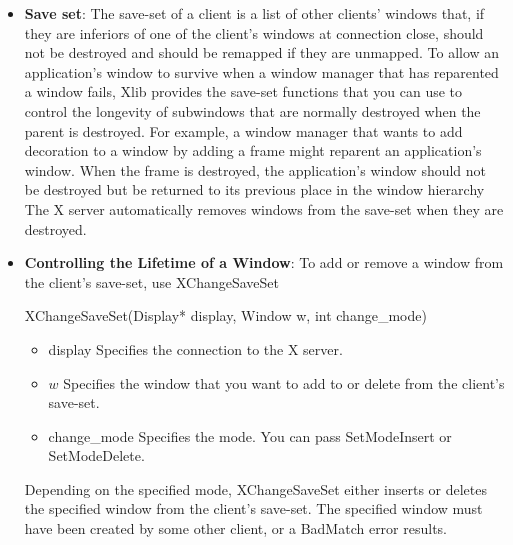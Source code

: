 \documentclass{report}
\begin{document}
\begin{itemize}
\begin{itemize}
                \item The new parent is InputOnly, and the window is not.
                \item The specified window has a ParentRelative background, and the new parent window is not the same depth as the specified window.
            \end{itemize}
            XReparentWindow can generate BadMatch and BadWindow errors.
        \item \textbf{Save set}: The save-set of a client is a list of other clients’ windows that, if they are inferiors of one of the client’s windows at connection close, should not be destroyed and should be remapped if they are unmapped. 
            \bigbreak \noindent 
            To allow an application’s window to survive when a window manager that has reparented a window fails, Xlib provides the save-set functions that you can use to control the longevity of subwindows that are normally destroyed when the parent is destroyed. For example, a window manager that wants to add decoration to a window by adding a frame might reparent an application’s window. When the frame is destroyed, the application’s window should not be destroyed but be returned to its previous place in the window hierarchy
            \bigbreak \noindent 
            The X server automatically removes windows from the save-set when they are destroyed.
        \item \textbf{Controlling the Lifetime of a Window}: To add or remove a window from the client’s save-set, use XChangeSaveSet
            \bigbreak \noindent 
            \begin{cppcode}
                XChangeSaveSet(Display* display, Window w, int change_mode)
            \end{cppcode}
            \bigbreak \noindent
            \begin{itemize}
                \item display Specifies the connection to the X server.
                \item $w$ Specifies the window that you want to add to or delete from the client’s save-set.
                \item change\_mode Specifies the mode. You can pass SetModeInsert or SetModeDelete.
            \end{itemize}
            Depending on the specified mode, XChangeSaveSet either inserts or deletes the specified window from the client’s save-set. The specified window must have been created by some other client, or a BadMatch error results.

\end{itemize}
\end{document}
